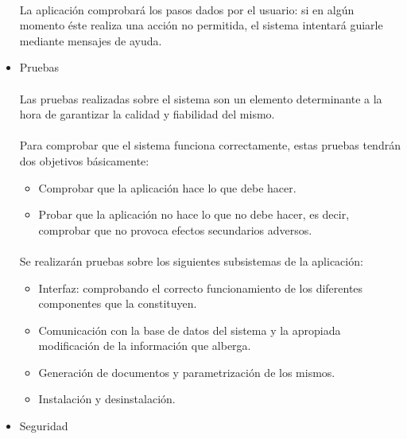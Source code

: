 \begin{itemize}
   \paragraph{}La aplicación comprobará los pasos dados por el usuario: si en
   algún momento éste realiza una acción no permitida, el sistema intentará
   guiarle mediante mensajes de ayuda.

 \item Pruebas

   \paragraph{}Las pruebas realizadas sobre el sistema son un elemento
   determinante a la hora de garantizar la calidad y fiabilidad del mismo.

   \paragraph{}Para comprobar que el sistema funciona correctamente, estas
   pruebas tendrán dos objetivos básicamente:

   \begin{itemize}
      \item Comprobar que la aplicación hace lo que debe hacer.
      \item Probar que la aplicación no hace lo que no debe hacer, es decir,
      comprobar que no provoca efectos secundarios adversos.
   \end{itemize}

   \paragraph{}Se realizarán pruebas sobre los siguientes subsistemas de la
   aplicación:

   \begin{itemize}
      \item Interfaz: comprobando el correcto funcionamiento de los diferentes
      componentes que la constituyen.
      \item Comunicación con la base de datos del sistema y la apropiada
      modificación de la información que alberga.
      \item Generación de documentos y parametrización de los mismos.
      \item Instalación y desinstalación.
   \end{itemize}

 \item Seguridad


\end{itemize}
